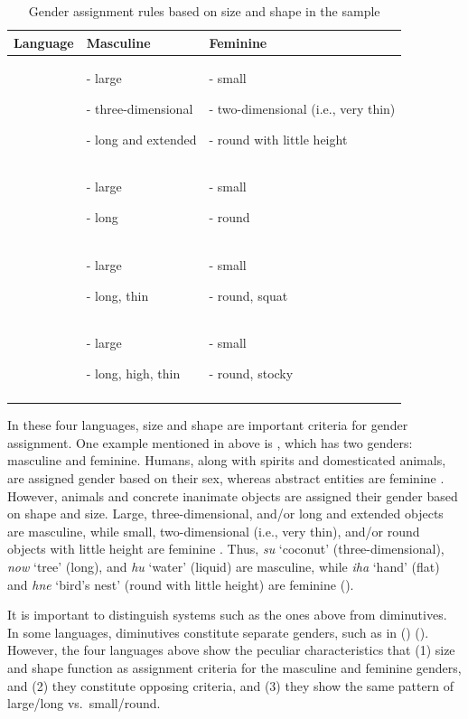 \documentclass[output=collectionpaper]{langsci/langscibook}
\begin{document}
\begin{table}
\begin{tabularx}{\textwidth}{lQQ}
\lsptoprule
 Language &  Masculine\footnotemark{} & Feminine\\\midrule
{} & {{}- large}

{{}- three-dimensional}

{}- long and extended & {{}- small}

{{}- two-dimensional (i.e., very thin)}

{}- round with little height\\
 & {{}- large}

{}- long & {{}- small}

{}- round\\
 & {{}- large}

{}- long, thin & {{}- small}

{}- round, squat\\
 & {{}- large}

{}- long, high, thin & {{}- small}

{}- round, stocky\\
\lspbottomrule
\end{tabularx}

\caption{Gender assignment rules based on size and shape in the sample}
\label{tab:Svard:13}
\end{table}


In these four languages, size and shape are important criteria for gender assignment. One example mentioned in  above is , which has two genders: masculine and feminine. Humans, along with spirits and domesticated animals, are assigned gender based on their sex, whereas abstract entities are feminine \citep[47]{Lock2011}. However, animals and concrete inanimate objects are assigned their gender based on shape and size. Large, three-dimensional, and/or long and extended objects are masculine, while small, two-dimensional (i.e., very thin), and/or round objects with little height are feminine \citep[47]{Lock2011}. Thus, \textit{su} `coconut' (three-dimensional), \textit{now} `tree' (long), and \textit{hu} `water' (liquid) are masculine, while \textit{iha} `hand' (flat) and \textit{hne} `bird's nest' (round with little height) are feminine (\citealt[48--50]{Lock2011}).



It is important to distinguish systems such as the ones above from diminutives. In some languages, diminutives constitute separate genders, such as in  () (\citealt[68--69]{Onishi1994}). However, the four languages above show the peculiar characteristics that (1) size and shape function as assignment criteria for the masculine and feminine genders, and (2) they constitute opposing criteria, and (3) they show the same pattern of large/long vs.\ small/round.
\end{document}
